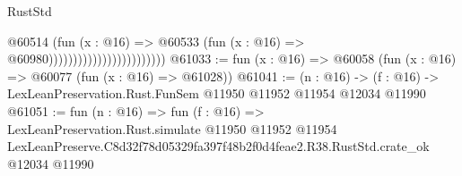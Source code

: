 \begin{lexlean}{RustStd}
\begin{coremodule}
                                              @60514
                                                (fun (x : @16) =>
                                                @60533
                                                  (fun (x : @16) => @60980))))))))))))))))))))))))
@61033 := fun (x : @16) => @60058 (fun (x : @16) => @60077 (fun (x : @16) => @61028))
@61041 := (n : @16) ->
  (f : @16) -> LexLeanPreservation.Rust.FunSem @11950 @11952 @11954 @12034 @11990
@61051 := fun (n : @16) =>
  fun (f : @16) =>
  LexLeanPreservation.Rust.simulate
    @11950
    @11952
    @11954
    LexLeanPreserve.C8d32f78d05329fa397f48b2f0d4feae2.R38.RustStd.crate_ok
    @12034
    @11990
\end{coremodule}
\end{lexlean}
